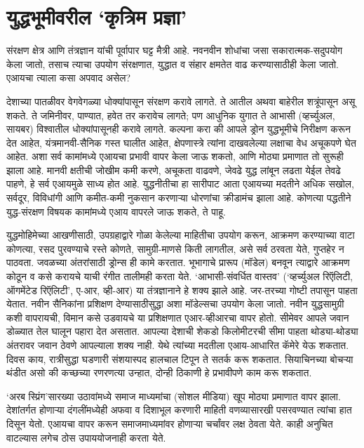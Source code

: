 \chapter{युद्धभूमीवरील `कृत्रिम प्रज्ञा'}

संरक्षण क्षेत्र आणि तंत्रज्ञान यांची पूर्वापार घट्ट मैत्री आहे. नवनवीन शोधांचा जसा सकारात्मक-सदुपयोग केला जातो, तसाच त्याचा उपयोग संरक्षणात, युद्धात व संहार क्षमतेत वाढ करण्यासाठीही केला जातो. एआयचा त्याला कसा अपवाद असेल?

देशाच्या पातळीवर वेगवेगळ्या धोक्यांपासून संरक्षण करावे लागते. ते आतील अथवा बाहेरील शत्रूंपासून असू शकते. ते जमिनीवर, पाण्यात, हवेत तर करावेच लागते; पण आधुनिक युगात ते आभासी (व्हर्च्युअल, सायबर) विश्वातील धोक्यांपासूनही करावे लागते. कल्पना करा की आपले ड्रोन युद्धभूमीचे निरीक्षण करून देत आहेत, यंत्रमानवी-सैनिक गस्त घालीत आहेत, क्षेपणास्त्रे त्यांना दाखवलेल्या लक्षाचा वेध अचूकपणे घेत आहेत. अशा सर्व कामांमध्ये एआयचा प्रभावी वापर केला जाऊ शकतो, आणि मोठ्या प्रमाणात तो सुरूही झाला आहे. मानवी क्षतीची जोखीम कमी करणे, अचूकता वाढवणे, जेवढे युद्ध लांबून लढता येईल तेवढे पाहणे, हे सर्व एआयमुळे साध्य होत आहे. युद्धनीतीचा हा सारीपाट आता एआयच्या मदतीने अधिक सखोल, सर्वदूर, विविधांगी आणि कमीत-कमी नुकसान करणाऱ्या धोरणांचा क्रीडामंच झाला आहे. कोणत्या पद्धतीने युद्ध-संरक्षण विषयक कामांमध्ये एआय वापरले जाऊ शकते, ते पाहू.

युद्धमोहिमेच्या आखणीसाठी, उपग्रहाद्वारे गोळा केलेल्या माहितीचा उपयोग करून, आक्रमण करण्याच्या वाटा कोणत्या, रसद पुरवण्याचे रस्ते कोणते, सामुग्री-माणसे किती लागतील, असे सर्व ठरवता येते, गुप्तहेर न पाठवता. जवळच्या अंतरांसाठी ड्रोन्स ही कामे करतात. भूभागाचे प्रारूप (मॉडेल) बनवून त्याद्वारे आक्रमण कोठून व कसे करायचे याची रंगीत तालीमही करता येते. `आभासी-संवर्धित वास्तव' (`व्हर्च्युअल रिऍलिटी, ऑगमेंटेड रिऍलिटी', ए-आर, व्ही-आर) या तंत्रज्ञानाने हे शक्य झाले आहे. जर-तरच्या गोष्टी तपासून पाहता येतात. नवीन सैनिकांना प्रशिक्षण देण्यासाठीसुद्धा अशा मॉडेल्सचा उपयोग केला जातो.  नवीन युद्धसामुग्री कशी वापरायची, विमान कसे उडवायचे या प्रशिक्षणात एआर-व्हीआरचा वापर होतो. सीमेवर आपले जवान डोळ्यात तेल घालून पहारा देत असतात. आपल्या देशाची शेकडो किलोमीटरची सीमा पाहता थोड्या-थोड्या अंतरावर जवान ठेवणे आपल्याला शक्य नाही. येथे त्यांच्या मदतीला एआय-आधारित कॅमेरे येऊ शकतात. दिवस काय, रात्रीसुद्धा घडणारी संशयास्पद हालचाल टिपून ते सतर्क करू शकतात. सियाचिनच्या बोचऱ्या थंडीत असो की कच्छच्या रणरणत्या उन्हात, दोन्ही ठिकाणी हे प्रभावीपणे काम करू शकतात. 

`अरब स्प्रिंग'सारख्या उठावांमध्ये समाज माध्यमांचा (सोशल मीडिया) खूप मोठ्या प्रमाणात वापर झाला. देशांतर्गत होणाऱ्या दंगलींमध्येही अफवा व दिशाभूल करणारी माहिती वणव्यासारखी पसरवण्यात त्यांचा हात दिसून येतो. एआयचा वापर करून समाजमाध्यमांवर होणाऱ्या चर्चांवर लक्ष ठेवता येते. काही अनुचित वाटल्यास लगेच ठोस उपाययोजनाही करता येते. 

